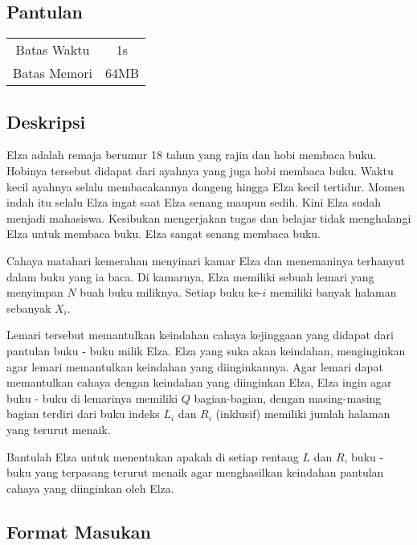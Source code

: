 \documentclass{article}
\begin{document}
\begin{center}
    \section*{Pantulan} %

    \begin{tabular}{ | c c | }
        \hline
        Batas Waktu  & 1s \\    %
        Batas Memori & 64MB \\  %
        \hline
    \end{tabular}
\end{center}

\subsection*{Deskripsi}

Elza adalah remaja berumur 18 tahun yang rajin dan hobi membaca buku.
Hobinya tersebut didapat dari ayahnya yang juga hobi membaca buku.
Waktu kecil ayahnya selalu membacakannya dongeng hingga Elza kecil tertidur.
Momen indah itu selalu Elza ingat saat Elza senang maupun sedih.
Kini Elza sudah menjadi mahasiswa.
Kesibukan mengerjakan tugas dan belajar tidak menghalangi Elza untuk membaca buku.
Elza sangat senang membaca buku.

Cahaya matahari kemerahan menyinari kamar Elza dan menemaninya terhanyut dalam buku yang ia baca.
Di kamarnya, Elza memiliki sebuah lemari yang menyimpan $N$ buah buku miliknya. Setiap buku ke-$i$ 
memiliki banyak halaman sebanyak $X_i$.

Lemari tersebut memantulkan keindahan cahaya kejinggaan yang didapat dari pantulan buku - buku milik Elza.
Elza yang suka akan keindahan, menginginkan agar lemari memantulkan keindahan yang diinginkannya.
Agar lemari dapat memantulkan cahaya dengan keindahan yang diinginkan Elza,
Elza ingin agar buku - buku di lemarinya memiliki $Q$ bagian-bagian, dengan masing-masing bagian terdiri dari buku indeks
$L_i$ dan $R_i$ (inklusif) memiliki jumlah halaman yang terurut menaik.

Bantulah Elza untuk menentukan apakah di setiap rentang $L$ dan $R$, buku - buku yang terpasang terurut menaik agar menghasilkan keindahan pantulan cahaya yang diinginkan oleh Elza.

\subsection*{Format Masukan}
\end{document}
